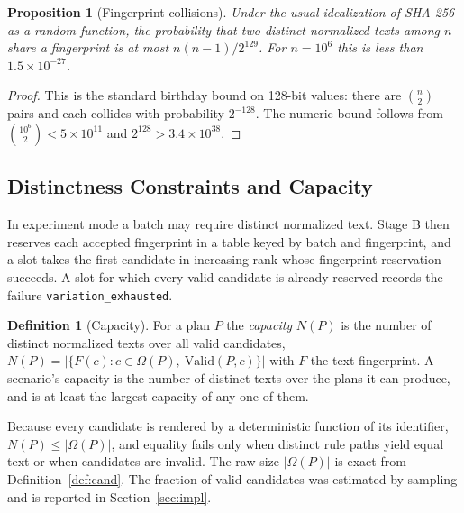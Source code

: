 \documentclass[11pt]{article}
\newtheorem{proposition}[theorem]{Proposition}
\theoremstyle{definition}
\newtheorem{definition}[theorem]{Definition}
\theoremstyle{remark}
\newcommand{\Valid}{\mathrm{Valid}}
\newcommand{\code}[1]{\texttt{#1}}
\begin{document}
\begin{proposition}[Fingerprint collisions]\label{prop:collide}
Under the usual idealization of SHA-256 as a random function, the probability that two distinct normalized texts among $n$ share a fingerprint is at most $n(n-1)/2^{129}$. For $n=10^{6}$ this is less than $1.5\times10^{-27}$.
\end{proposition}
\begin{proof}
This is the standard birthday bound on 128-bit values: there are $\binom{n}{2}$ pairs and each collides with probability $2^{-128}$. The numeric bound follows from $\binom{10^6}{2}<5\times10^{11}$ and $2^{128}>3.4\times10^{38}$.
\end{proof}

\subsection{Distinctness Constraints and Capacity}

In experiment mode a batch may require distinct normalized text. Stage B then reserves each accepted fingerprint in a table keyed by batch and fingerprint, and a slot takes the first candidate in increasing rank whose fingerprint reservation succeeds. A slot for which every valid candidate is already reserved records the failure \code{variation\_exhausted}.

\begin{definition}[Capacity]\label{def:capacity}
For a plan $P$ the \emph{capacity} $N(P)$ is the number of distinct normalized texts over all valid candidates, $N(P)=\bigl|\{F(c):c\in\Omega(P),\ \Valid(P,c)\}\bigr|$ with $F$ the text fingerprint. A scenario's capacity is the number of distinct texts over the plans it can produce, and is at least the largest capacity of any one of them.
\end{definition}

Because every candidate is rendered by a deterministic function of its identifier, $N(P)\le|\Omega(P)|$, and equality fails only when distinct rule paths yield equal text or when candidates are invalid. The raw size $|\Omega(P)|$ is exact from Definition~\ref{def:cand}. The fraction of valid candidates was estimated by sampling and is reported in Section~\ref{sec:impl}.
\end{document}
